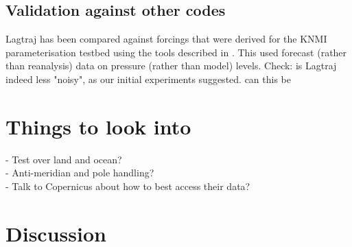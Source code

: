 \documentclass[a4paper,11pt]{article}
\begin{document}
\subsection{Validation against other codes}

Lagtraj has been compared against forcings that were derived for the KNMI parameterisation testbed using the tools described in .
This used forecast (rather than reanalysis) data on pressure (rather than model) levels.
Check: is Lagtraj indeed less "noisy", as our initial experiments suggested. can this be

\section*{Things to look into}

- Test over land and ocean? \\
- Anti-meridian and pole handling? \\
- Talk to Copernicus about how to best access their data? \\

\section{Discussion}



\end{document}
